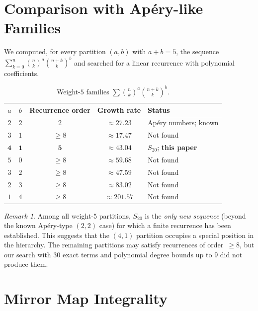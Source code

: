 \documentclass[12pt,reqno]{amsart}
\theoremstyle{plain}
\theoremstyle{definition}
\theoremstyle{remark}
\newtheorem{remark}[theorem]{Remark}
\begin{document}
\section{Comparison with Ap\'ery-like Families}\label{sec:families}

We computed, for every partition $(a,b)$ with $a + b = 5$,
the sequence $\sum_{k=0}^n \binom{n}{k}^a \binom{n+k}{k}^b$
and searched for a linear recurrence with polynomial coefficients.

\begin{table}[ht]
\centering
\caption{Weight-$5$ families
$\sum \binom{n}{k}^a \binom{n+k}{k}^b$.}
\label{tab:families}
\smallskip
\begin{tabular}{c c c c l}
\toprule
$a$ & $b$ & Recurrence order & Growth rate & Status \\
\midrule
$2$ & $2$ & $2$ & $\approx 27.23$ & Ap\'ery numbers; known \\
$3$ & $1$ & $\ge 8$ & $\approx 17.47$ & Not found \\
$\mathbf{4}$ & $\mathbf{1}$ & $\mathbf{5}$ & $\boldsymbol{\approx 43.04}$ & $S_{20}$; \textbf{this paper} \\
$5$ & $0$ & $\ge 8$ & $\approx 59.68$ & Not found \\
$3$ & $2$ & $\ge 8$ & $\approx 47.59$ & Not found \\
$2$ & $3$ & $\ge 8$ & $\approx 83.02$ & Not found \\
$1$ & $4$ & $\ge 8$ & $\approx 201.57$ & Not found \\
\bottomrule
\end{tabular}
\end{table}

\begin{remark}
Among all weight-$5$ partitions, $S_{20}$ is the
\emph{only new sequence} (beyond the known Ap\'ery-type $(2,2)$
case) for which a finite recurrence has been established.
This suggests that the $(4,1)$ partition occupies a special
position in the hierarchy.
The remaining partitions may satisfy recurrences of order~$\ge 8$,
but our search with $30$ exact terms and polynomial degree
bounds up to $9$ did not produce them.
\end{remark}


\section{Mirror Map Integrality}\label{sec:mirror}
\end{document}
